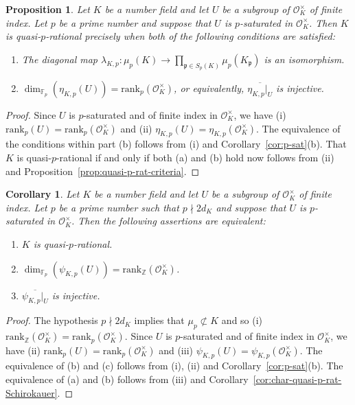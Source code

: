 \documentclass[12pt, a4paper, usenames]{amsart}
\newcommand{\Z}{\mathbb{Z}}
\newcommand{\F}{\mathbb{F}}
\theoremstyle{plain}
\newtheorem{corollary}[theorem]{Corollary}
\newtheorem{prop}[theorem]{Proposition}
\theoremstyle{remark}
\theoremstyle{definition}
\newcommand{\rank}{\mathrm{rank}}
\begin{document}
\begin{prop}\label{prop:quasi-p-rat-subgroup-of-units-eta}
Let $K$ be a number field and let $U$ be a subgroup of $\mathcal{O}_{K}^{\times}$ of finite index.
Let $p$ be a prime number and suppose that $U$ is $p$-saturated in $\mathcal{O}_{K}^{\times}$.
Then $K$ is quasi-$p$-rational precisely when
both of the following conditions are satisfied:
\begin{enumerate}
    \item The diagonal map 
$\lambda_{K,p} : \mu_{p}(K) \longrightarrow \prod_{\mathfrak{p} \in S_{p}(K)} \mu_{p}(K_{\mathfrak{p}})$
is an isomorphism.
    \item $\dim_{\F_p}(\eta_{K,p}(U))=\rank_{p}(\mathcal{O}_{K}^{\times})$, or equivalently, 
    $\overline{\eta_{K,p} \vert_{U}}$ is injective.
\end{enumerate}
\end{prop}

\begin{proof}
Since $U$ is $p$-saturated and of finite index in $\mathcal{O}_{K}^{\times}$,
we have (i) $\rank_{p}(U)=\rank_{p}(\mathcal{O}_{K}^{\times})$
and (ii) $\eta_{K,p}(U)=\eta_{K,p}(\mathcal{O}_{K}^{\times})$.
The equivalence of the conditions within part (b) follows from (i) 
and Corollary~\ref{cor:p-sat}(b).
That $K$ is quasi-$p$-rational if and only if both (a) and (b) hold
now follows from (ii) and Proposition~\ref{prop:quasi-p-rat-criteria}. 
\end{proof}

\begin{corollary}\label{cor:quasi-p-rat-subgroup-of-units-schirokauer}
Let $K$ be a number field and let $U$ be a subgroup of $\mathcal{O}_{K}^{\times}$ of finite index.
Let $p$ be a prime number such that $p \nmid 2d_{K}$ and suppose that $U$ is $p$-saturated in $\mathcal{O}_{K}^{\times}$.
Then the following assertions are equivalent:
\begin{enumerate}
    \item $K$ is quasi-$p$-rational.
    \item $\dim_{\F_p}(\psi_{K,p}(U))=\rank_{\Z}(\mathcal{O}_{K}^{\times})$. 
    \item $\overline{\psi_{K,p} \vert_{U}}$ is injective.
\end{enumerate}
\end{corollary}

\begin{proof}
The hypothesis $p \nmid 2d_{K}$ implies that $\mu_{p} \not\subset K$
and so (i) $\rank_{\Z}(\mathcal{O}_{K}^{\times})=\rank_{p}(\mathcal{O}_{K}^{\times})$.
Since $U$ is $p$-saturated and of finite index in $\mathcal{O}_{K}^{\times}$,
we have (ii) $\rank_{p}(U)=\rank_{p}(\mathcal{O}_{K}^{\times})$
and (iii) $\psi_{K,p}(U)=\psi_{K,p}(\mathcal{O}_{K}^{\times})$.
The equivalence of (b) and (c) follows from (i), (ii) and Corollary~\ref{cor:p-sat}(b).
The equivalence of (a) and (b) follows from (iii) and Corollary~\ref{cor:char-quasi-p-rat-Schirokauer}.
\end{proof}
\end{document}
